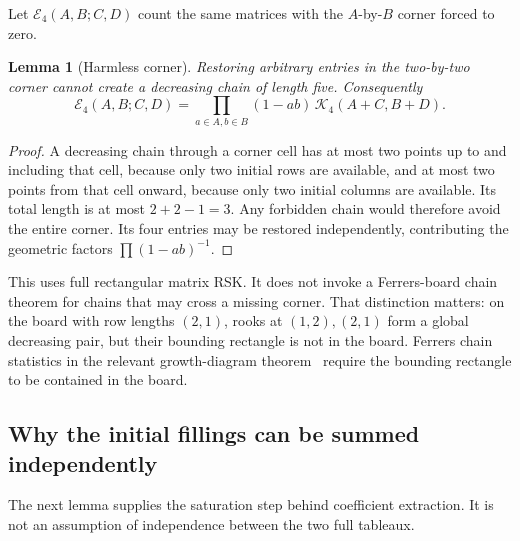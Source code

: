 \documentclass[11pt,letterpaper]{article}
\newtheorem{lemma}[theorem]{Lemma}
\theoremstyle{remark}\newtheorem{remark}[theorem]{Remark}
\numberwithin{equation}{section}
\begin{document}
Let $\mathcal E_4(A,B;C,D)$ count the same matrices with the
$A$-by-$B$ corner forced to zero.

\begin{lemma}[Harmless corner]\label{upo:ex5:lem:corner}
Restoring arbitrary entries in the two-by-two corner cannot create
a decreasing chain of length five. Consequently
\begin{equation}\label{upo:ex5:eq:corner}
 \mathcal E_4(A,B;C,D)
 =\prod_{a\in A,b\in B}(1-ab)\,
   \mathcal K_4(A+C,B+D).
\end{equation}
\end{lemma}
\begin{proof}
A decreasing chain through a corner cell has at most two points up
to and including that cell, because only two initial rows are
available, and at most two points from that cell onward, because
only two initial columns are available. Its total length is at most
$2+2-1=3$. Any forbidden chain would therefore avoid the entire
corner. Its four entries may be restored independently, contributing
the geometric factors $\prod(1-ab)^{-1}$.
\end{proof}

This uses full rectangular matrix RSK. It does not invoke a
Ferrers-board chain theorem for chains that may cross a missing
corner. That distinction matters: on the board with row lengths
$(2,1)$, rooks at $(1,2),(2,1)$ form a global decreasing pair,
but their bounding rectangle is not in the board. Ferrers chain
statistics in the relevant growth-diagram theorem~\cite{Krat}
require the bounding rectangle to be contained in the board.

\subsection{Why the initial fillings can be summed independently}
The next lemma supplies the saturation step behind coefficient
extraction. It is not an assumption of independence between the two
full tableaux.
\end{document}
